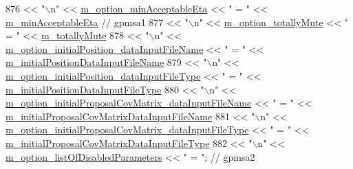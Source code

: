\begin{DoxyCode}
876      << \textcolor{stringliteral}{"\(\backslash\)n"} << \hyperlink{class_q_u_e_s_o_1_1_m_l_sampling_level_options_a3af49d715cf211ed67e5206bc0d1840d}{m\_option\_minAcceptableEta}                           << \textcolor{stringliteral}{" = "} << 
      \hyperlink{class_q_u_e_s_o_1_1_m_l_sampling_level_options_a8230c7dd67833668237d3dc5b19c53c5}{m\_minAcceptableEta} \textcolor{comment}{// gpmsa1}
877      << \textcolor{stringliteral}{"\(\backslash\)n"} << \hyperlink{class_q_u_e_s_o_1_1_m_l_sampling_level_options_a303f13a4f8fe1fb586ada0b95c0c2f8c}{m\_option\_totallyMute}                                << \textcolor{stringliteral}{" = "} << 
      \hyperlink{class_q_u_e_s_o_1_1_m_l_sampling_level_options_aeb5b3d634be08ac24bdc008ecfbf08b6}{m\_totallyMute}
878      << \textcolor{stringliteral}{"\(\backslash\)n"} << \hyperlink{class_q_u_e_s_o_1_1_m_l_sampling_level_options_a08ae170166172f72b1b98e523ce0d71c}{m\_option\_initialPosition\_dataInputFileName}       
         << \textcolor{stringliteral}{" = "} << \hyperlink{class_q_u_e_s_o_1_1_m_l_sampling_level_options_ac27dd9d3b5a376bfd146caa62fa32613}{m\_initialPositionDataInputFileName}
879      << \textcolor{stringliteral}{"\(\backslash\)n"} << \hyperlink{class_q_u_e_s_o_1_1_m_l_sampling_level_options_a562837ca20c890940f09e7ea90b5aaf4}{m\_option\_initialPosition\_dataInputFileType}       
         << \textcolor{stringliteral}{" = "} << \hyperlink{class_q_u_e_s_o_1_1_m_l_sampling_level_options_a582573c99a718b1eefe417c0cccf071f}{m\_initialPositionDataInputFileType}
880      << \textcolor{stringliteral}{"\(\backslash\)n"} << \hyperlink{class_q_u_e_s_o_1_1_m_l_sampling_level_options_ada1645363cc30723d66b6c8237425ec3}{m\_option\_initialProposalCovMatrix\_dataInputFileName}
       << \textcolor{stringliteral}{" = "} << \hyperlink{class_q_u_e_s_o_1_1_m_l_sampling_level_options_aa2dd58cb7865577da082fde9f0b180cb}{m\_initialProposalCovMatrixDataInputFileName}
881      << \textcolor{stringliteral}{"\(\backslash\)n"} << \hyperlink{class_q_u_e_s_o_1_1_m_l_sampling_level_options_a75a15f2c496d82ce310669fb9de753c5}{m\_option\_initialProposalCovMatrix\_dataInputFileType}
       << \textcolor{stringliteral}{" = "} << \hyperlink{class_q_u_e_s_o_1_1_m_l_sampling_level_options_a6e6ea2f36afd7b6a6900eaf44165a796}{m\_initialProposalCovMatrixDataInputFileType}
882      << \textcolor{stringliteral}{"\(\backslash\)n"} << \hyperlink{class_q_u_e_s_o_1_1_m_l_sampling_level_options_a296043cd6f00282ccf1a39e219aa16ef}{m\_option\_listOfDisabledParameters}                   << \textcolor{stringliteral}{" =
       "}; \textcolor{comment}{// gpmsa2}

\end{DoxyCode}
